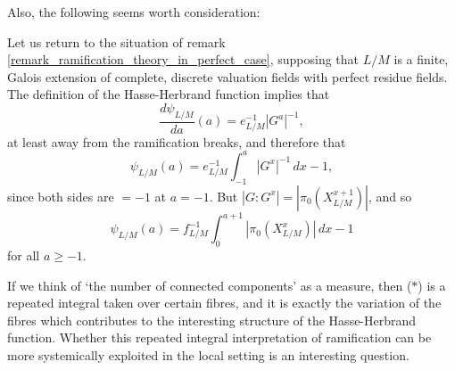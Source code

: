 \documentclass{lmsMODIFIED}
\begin{document}
Also, the following seems worth consideration:

\begin{remark}
Let us return to the situation of remark \ref{remark_ramification_theory_in_perfect_case}, supposing that $L/M$ is a finite, Galois extension of complete, discrete valuation fields with perfect residue fields. The definition of the Hasse-Herbrand function implies that \[\frac{d\psi_{L/M}}{da}(a)=e_{L/M}^{-1}|G^a|^{-1},\] at least away from the ramification breaks, and therefore that \[\psi_{L/M}(a)=e_{L/M}^{-1}\int_{-1}^a|G^x|^{-1}\,dx-1,\] since both sides are $=-1$ at $a=-1$. But $|G:G^x|=|\pi_0(X_{L/M}^{x+1})|$, and so \[\psi_{L/M}(a)=f_{L/M}^{-1}\int_0^{a+1}|\pi_0(X_{L/M}^x)|\,dx-1\tag{$\ast$}\] for all $a\ge -1$.

If we think of `the number of connected components' as a measure, then ($\ast$) is a repeated integral taken over certain fibres, and it is exactly the variation of the fibres which contributes to the interesting structure of the Hasse-Herbrand function. Whether this repeated integral interpretation of ramification can be more systemically exploited in the local setting is an interesting question.
\end{remark}
\end{document}
